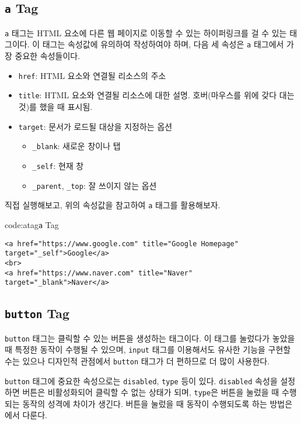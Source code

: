 \subsection*{\texttt{a} Tag}
\texttt{a} 태그는 HTML 요소에 다른 웹 페이지로 이동할 수 있는 하이퍼링크를 걸 수 있는 태그이다. 이 태그는 속성값에 유의하여 작성하여야 하며, 다음 세 속성은 \texttt{a} 태그에서 가장 중요한 속성들이다.
\newpage

\begin{itemize}
    \item \texttt{href}: HTML 요소와 연결될 리소스의 주소
    \item \texttt{title}: HTML 요소와 연결될 리소스에 대한 설명. 호버(마우스를 위에 갖다 대는 것)를 했을 때 표시됨.
    \item \texttt{target}: 문서가 로드될 대상을 지정하는 옵션
        \begin{itemize}
            \item \texttt{\_blank}: 새로운 창이나 탭
            \item \texttt{\_self}: 현재 창
            \item \texttt{\_parent}, \texttt{\_top}: 잘 쓰이지 않는 옵션
        \end{itemize}
\end{itemize}

\를 직접 실행해보고, 위의 속성값을 참고하여 \texttt{a} 태그를 활용해보자.

\begin{codeenv}{code:atag}{\texttt{a} Tag}\begin{verbatim}
<a href="https://www.google.com" title="Google Homepage" target="_self">Google</a>
<br>
<a href="https://www.naver.com" title="Naver" target="_blank">Naver</a>
\end{verbatim}
\end{codeenv}

\subsection*{\texttt{button} Tag}
\texttt{button} 태그는 클릭할 수 있는 버튼을 생성하는 태그이다. 이 태그를 눌렀다가 놓았을 때 특정한 동작이 수행될 수 있으며, \texttt{input} 태그를 이용해서도 유사한 기능을 구현할 수는 있으나 디자인적 관점에서 \texttt{button} 태그가 더 편하므로 더 많이 사용한다. 

\texttt{button} 태그에 중요한 속성으로는 \texttt{disabled}, \texttt{type} 등이 있다. \texttt{disabled} 속성을 설정하면 버튼은 비활성화되어 클릭할 수 없는 상태가 되며, \texttt{type}은 버튼을 눌렀을 때 수행되는 동작의 성격에 차이가 생긴다. 버튼을 눌렀을 때 동작이 수행되도록 하는 방법은 에서 다룬다.

